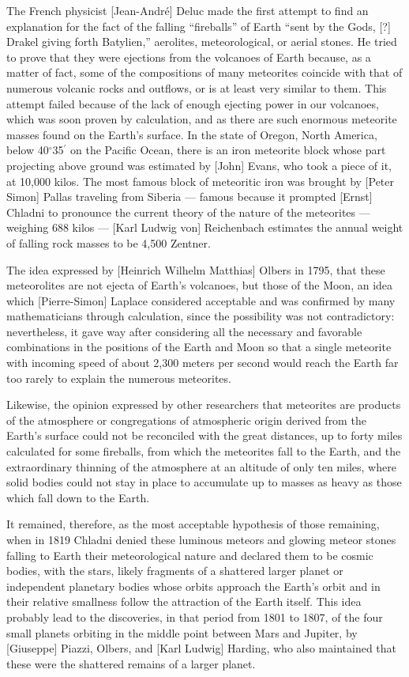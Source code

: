\documentclass[a4paper, 12pt, oneside]{article}
\begin{document}
The French physicist [Jean-André] Deluc made the first attempt to find an explanation for the fact of the falling ``fireballs'' of Earth ``sent by the Gods, [?] Drakel giving forth Batylien,'' aerolites, meteorological, or aerial stones. He tried to prove that they were ejections from the volcanoes of Earth because, as a matter of fact, some of the compositions of many meteorites coincide with that of numerous volcanic rocks and outflows, or is at least very similar to them. This attempt failed because of the lack of enough ejecting power in our volcanoes, which was soon proven by calculation, and as there are such enormous meteorite masses found on the Earth's surface. In the state of Oregon, North America, below 40$^{\circ}$35$^\prime$ on the Pacific Ocean, there is an iron meteorite block whose part projecting above ground was estimated by [John] Evans, who took a piece of it, at 10,000 kilos. The most famous block of meteoritic iron was brought by [Peter Simon] Pallas traveling from Siberia --- famous because it prompted [Ernst] Chladni to pronounce the current theory of the nature of the meteorites --- weighing 688 kilos --- [Karl Ludwig von] Reichenbach estimates the annual weight of falling rock masses to be 4,500 Zentner.

The idea expressed by [Heinrich Wilhelm Matthias] Olbers in 1795, that these meteorolites are not ejecta of Earth's volcanoes, but those of the Moon, an idea which [Pierre-Simon] Laplace considered acceptable and was confirmed by many mathematicians through calculation, since the possibility was not contradictory: nevertheless, it gave way after considering all the necessary and favorable combinations in the positions of the Earth and Moon so that a single meteorite with incoming speed of about 2,300 meters per second would reach the Earth far too rarely to explain the numerous meteorites.

Likewise, the opinion expressed by other researchers that meteorites are products of the atmosphere or congregations of atmospheric origin derived from the Earth's surface could not be reconciled with the great distances, up to forty miles calculated for some fireballs, from which the meteorites fall to the Earth, and the extraordinary thinning of the atmosphere at an altitude of only ten miles, where solid bodies could not stay in place to accumulate up to masses as heavy as those which fall down to the Earth.

It remained, therefore, as the most acceptable hypothesis of those remaining, when in 1819 Chladni denied these luminous meteors and glowing meteor stones falling to Earth their meteorological nature and declared them to be cosmic bodies, with the stars, likely fragments of a shattered larger planet or independent planetary bodies whose orbits approach the Earth's orbit and in their relative smallness follow the attraction of the Earth itself. This idea probably lead to the discoveries, in that period from 1801 to 1807, of the four small planets orbiting in the middle point between Mars and Jupiter, by [Giuseppe] Piazzi, Olbers, and [Karl Ludwig] Harding, who also maintained that these were the shattered remains of a larger planet.
\end{document}
